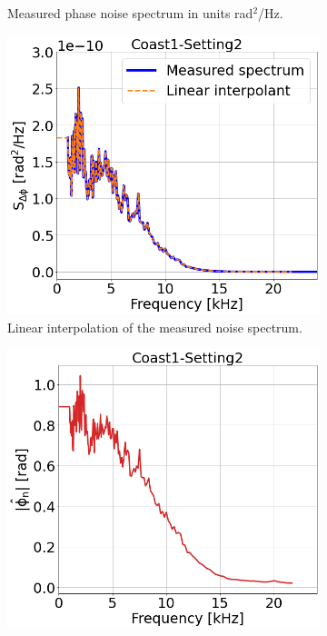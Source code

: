 \begin{figure}[!ht]
\begin{subfigure}[t]{0.42\textwidth}
        \caption{Measured phase noise spectrum in  units rad$^2$/Hz.}
        \label{fig:coast1_setting2_b}
    \end{subfigure}
    \hfill
    \begin{subfigure}[t]{0.42\textwidth}
        \centering
        \includegraphics[width=1\textwidth]{./images/app_B/coast1_setting2_v3.png}
        \caption{Linear interpolation of the measured noise spectrum. %
        }
        \label{fig:coast1_setting2_c}
    \end{subfigure}
    \hfill
    \begin{subfigure}[t]{0.42\textwidth}
        \centering
        \includegraphics[width=1\textwidth]{./images/app_B/coast1_setting3_v4.png}

\end{subfigure}
\end{figure}
